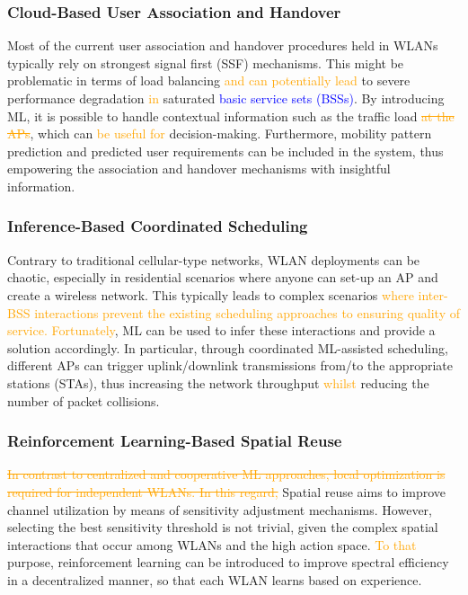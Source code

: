 \documentclass[journal]{IEEEtran}
\begin{document}
\subsubsection{Cloud-Based User Association and Handover}
Most of the current user association and handover procedures held in WLANs typically rely on strongest signal first (SSF) mechanisms. This might be problematic in terms of load balancing \textcolor{orange}{and can potentially lead} to severe performance degradation \textcolor{orange}{in} saturated \textcolor{blue}{basic service sets (BSSs)}. By introducing ML, it is possible to handle contextual information such as the traffic load \textcolor{orange}{\st{at the APs}}, which can \textcolor{orange}{be useful for} decision-making. Furthermore, mobility pattern prediction and predicted user requirements can be included in the system, thus empowering the association and handover mechanisms with insightful information. %


\subsubsection{Inference-Based Coordinated Scheduling}
Contrary to traditional cellular-type networks, WLAN deployments can be chaotic, especially in residential scenarios where anyone can set-up an AP and create a wireless network. This typically leads to complex scenarios \textcolor{orange}{where inter-BSS interactions prevent the existing scheduling approaches to ensuring quality of service.} \textcolor{orange}{Fortunately}, ML can be used to infer these interactions and provide a solution accordingly. In particular, through coordinated ML-assisted scheduling, different APs can trigger uplink/downlink transmissions from/to the appropriate stations (STAs), thus increasing the network throughput \textcolor{orange}{whilst} reducing the number of packet collisions.

\subsubsection{Reinforcement Learning-Based Spatial Reuse} 
\textcolor{orange}{\st{In contrast to centralized and cooperative ML approaches, local optimization is required for independent WLANs. In this regard,}} Spatial reuse aims to improve channel utilization by means of sensitivity adjustment mechanisms. However, selecting the best sensitivity threshold is not trivial, given the complex spatial interactions that occur among WLANs and the high action space. \textcolor{orange}{To that} purpose, reinforcement learning can be introduced to improve spectral efficiency in a decentralized manner, so that each WLAN learns based on experience.
\end{document}
